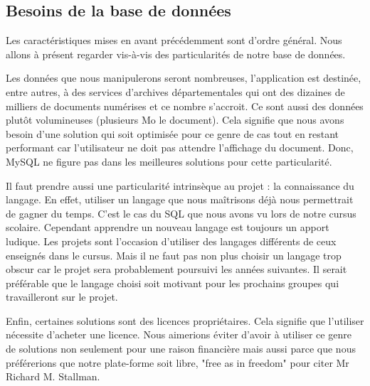     \subsection{Besoins de la base de données}
    \label{subsec:besoinplateforme}
    Les caractéristiques mises en avant précédemment sont d’ordre général. Nous allons à présent regarder
    vis-à-vis des particularités de notre base de données.

    Les données que nous manipulerons seront nombreuses, l’application est destinée, entre autres,
    à des services d’archives départementales qui ont des dizaines de milliers de documents numérises
    et ce nombre s’accroit. Ce sont aussi des données plutôt volumineuses (plusieurs Mo le document).
    Cela signifie que nous avons besoin d’une solution qui soit optimisée pour ce genre de cas tout
    en restant performant car l’utilisateur ne doit pas attendre l’affichage du document.
    Donc, MySQL ne figure pas dans les meilleures solutions pour cette particularité.

    Il faut prendre aussi une particularité intrinsèque au projet : la connaissance du langage.
    En effet, utiliser un langage que nous maîtrisons déjà nous permettrait de gagner du temps.
    C’est le cas du SQL que nous avons vu lors de notre cursus scolaire. Cependant apprendre un
    nouveau langage est toujours un apport ludique. Les projets sont l’occasion d’utiliser des
    langages différents de ceux enseignés dans le cursus. Mais il ne faut pas non plus choisir un
    langage trop obscur car le projet sera probablement poursuivi les années suivantes. Il serait
    préférable que le langage choisi soit motivant pour les prochains groupes qui travailleront sur le projet.

    Enfin, certaines solutions sont des licences propriétaires. Cela signifie que l’utiliser nécessite d’acheter
    une licence. Nous aimerions éviter d’avoir à utiliser ce genre de solutions non seulement pour une raison
    financière mais aussi parce que nous préférerions  que notre plate-forme soit libre, "free as in freedom"
    pour citer Mr Richard M. Stallman.
